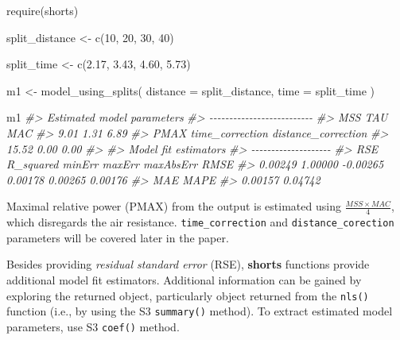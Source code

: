 \documentclass[fleqn,10pt]{wlpeerj} %
\newenvironment{Shaded}{\begin{snugshade}}{\end{snugshade}}
\newcommand{\AttributeTok}[1]{\textcolor[rgb]{0.77,0.63,0.00}{#1}}
\newcommand{\CommentTok}[1]{\textcolor[rgb]{0.56,0.35,0.01}{\textit{#1}}}
\newcommand{\DecValTok}[1]{\textcolor[rgb]{0.00,0.00,0.81}{#1}}
\newcommand{\FloatTok}[1]{\textcolor[rgb]{0.00,0.00,0.81}{#1}}
\newcommand{\FunctionTok}[1]{\textcolor[rgb]{0.00,0.00,0.00}{#1}}
\newcommand{\NormalTok}[1]{#1}
\newcommand{\OtherTok}[1]{\textcolor[rgb]{0.56,0.35,0.01}{#1}}
\begin{document}
\begin{Shaded}
\begin{Highlighting}[]
\FunctionTok{require}\NormalTok{(shorts)}

\NormalTok{split\_distance }\OtherTok{\textless{}{-}} \FunctionTok{c}\NormalTok{(}\DecValTok{10}\NormalTok{, }\DecValTok{20}\NormalTok{, }\DecValTok{30}\NormalTok{, }\DecValTok{40}\NormalTok{)}

\NormalTok{split\_time }\OtherTok{\textless{}{-}} \FunctionTok{c}\NormalTok{(}\FloatTok{2.17}\NormalTok{, }\FloatTok{3.43}\NormalTok{, }\FloatTok{4.60}\NormalTok{, }\FloatTok{5.73}\NormalTok{)}

\NormalTok{m1 }\OtherTok{\textless{}{-}} \FunctionTok{model\_using\_splits}\NormalTok{(}
  \AttributeTok{distance =}\NormalTok{ split\_distance,}
  \AttributeTok{time =}\NormalTok{ split\_time}
\NormalTok{)}

\NormalTok{m1}
\CommentTok{\#\textgreater{} Estimated model parameters}
\CommentTok{\#\textgreater{} {-}{-}{-}{-}{-}{-}{-}{-}{-}{-}{-}{-}{-}{-}{-}{-}{-}{-}{-}{-}{-}{-}{-}{-}{-}{-}}
\CommentTok{\#\textgreater{}                 MSS                 TAU                 MAC }
\CommentTok{\#\textgreater{}                9.01                1.31                6.89 }
\CommentTok{\#\textgreater{}                PMAX     time\_correction distance\_correction }
\CommentTok{\#\textgreater{}               15.52                0.00                0.00 }
\CommentTok{\#\textgreater{} }
\CommentTok{\#\textgreater{} Model fit estimators}
\CommentTok{\#\textgreater{} {-}{-}{-}{-}{-}{-}{-}{-}{-}{-}{-}{-}{-}{-}{-}{-}{-}{-}{-}{-}}
\CommentTok{\#\textgreater{}       RSE R\_squared    minErr    maxErr maxAbsErr      RMSE }
\CommentTok{\#\textgreater{}   0.00249   1.00000  {-}0.00265   0.00178   0.00265   0.00176 }
\CommentTok{\#\textgreater{}       MAE      MAPE }
\CommentTok{\#\textgreater{}   0.00157   0.04742}
\end{Highlighting}
\end{Shaded}

\normalsize

Maximal relative power (PMAX) from the output is estimated using \(\frac{MSS \times MAC}{4}\), which disregards the air resistance. \texttt{time\_correction} and \texttt{distance\_corection} parameters will be covered later in the paper.

Besides providing \emph{residual standard error} (RSE), \textbf{shorts} functions provide additional model fit estimators. Additional information can be gained by exploring the returned object, particularly object returned from the \texttt{nls()} function (i.e., by using the S3 \texttt{summary()} method). To extract estimated model parameters, use S3 \texttt{coef()} method.
\end{document}
